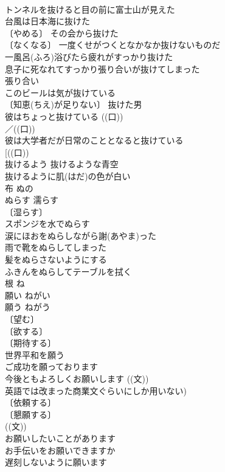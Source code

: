 \documentclass[8pt]{extreport}
\begin{document}
\begin{CJK}{UTF8}{min}
\\	トンネルを抜けると目の前に富士山が見えた 
\\	台風は日本海に抜けた 
\\	〔やめる〕 その会から抜けた 
\\	〔なくなる〕 一度くせがつくとなかなか抜けないものだ 
\\	一風呂(ふろ)浴びたら疲れがすっかり抜けた 
\\	息子に死なれてすっかり張り合いが抜けてしまった 
\\	張り合い　
\\	このビールは気が抜けている 
\\	〔知恵(ちえ)が足りない〕 抜けた男 
\\	彼はちょっと抜けている ((口)) 
\\	／((口)) 
\\	彼は大学者だが日常のこととなると抜けている 
\\	[((口))
\\	抜けるよう 抜けるような青空 
\\	抜けるように肌(はだ)の色が白い 
\\	布	ぬの	
\\	ぬらす	濡らす	
\\	〔湿らす〕
\\	スポンジを水でぬらす 
\\	涙にほおをぬらしながら謝(あやま)った 
\\	雨で靴をぬらしてしまった 
\\	髪をぬらさないようにする 
\\	ふきんをぬらしてテーブルを拭く 
\\	根	ね	
\\	願い	ねがい	
\\	願う	ねがう	
\\	〔望む〕
\\	〔欲する〕
\\	〔期待する〕
\\	世界平和を願う 
\\	ご成功を願っております 
\\	今後ともよろしくお願いします ((文)) 
\\	英語では改まった商業文ぐらいにしか用いない) 
\\	〔依頼する〕
\\	〔懇願する〕
\\	((文)) 
\\	お願いしたいことがあります 
\\	お手伝いをお願いできますか 
\\	遅刻しないように願います 

\end{CJK}
\end{document}
